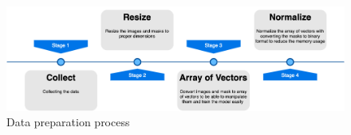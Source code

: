 \begin{figure}
    \centerline{\includegraphics[width=1\columnwidth]{04-methodology/figures/data-preparation-process.png}}
    \caption{Data preparation process}
    \label{fig:data-preparation-process}
\end{figure}